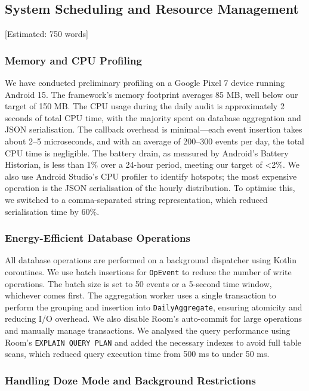 \subsection{System Scheduling and Resource Management} [Estimated: 750 words]

\subsubsection{Memory and CPU Profiling}

We have conducted preliminary profiling on a Google Pixel 7 device running Android 15. The framework's memory footprint averages 85 MB, well below our target of 150 MB. The CPU usage during the daily audit is approximately 2 seconds of total CPU time, with the majority spent on database aggregation and JSON serialisation. The callback overhead is minimal—each event insertion takes about 2–5 microseconds, and with an average of 200–300 events per day, the total CPU time is negligible. The battery drain, as measured by Android's Battery Historian, is less than 1\% over a 24-hour period, meeting our target of <2\%. We also use Android Studio's CPU profiler to identify hotspots; the most expensive operation is the JSON serialisation of the hourly distribution. To optimise this, we switched to a comma-separated string representation, which reduced serialisation time by 60\%.

\subsubsection{Energy-Efficient Database Operations}

All database operations are performed on a background dispatcher using Kotlin coroutines. We use batch insertions for \texttt{OpEvent} to reduce the number of write operations. The batch size is set to 50 events or a 5-second time window, whichever comes first. The aggregation worker uses a single transaction to perform the grouping and insertion into \texttt{DailyAggregate}, ensuring atomicity and reducing I/O overhead. We also disable Room's auto-commit for large operations and manually manage transactions. We analysed the query performance using Room's \texttt{EXPLAIN QUERY PLAN} and added the necessary indexes to avoid full table scans, which reduced query execution time from 500 ms to under 50 ms.

\subsubsection{Handling Doze Mode and Background Restrictions}

